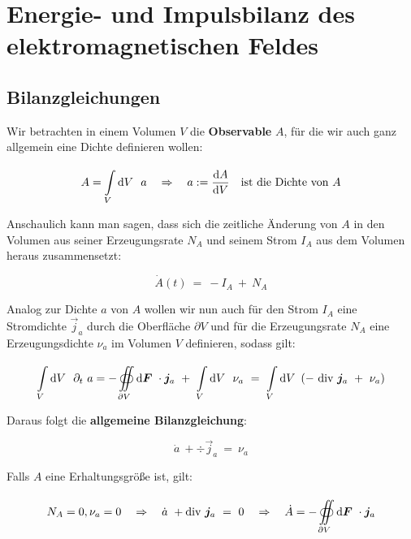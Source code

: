 \chapter[Energie- und Impulsbilanz]{Energie- und Impulsbilanz des elektromagnetischen Feldes}

\section{Bilanzgleichungen}

Wir betrachten in einem Volumen $V$ die \textbf{Observable} $A$, für die wir auch ganz allgemein eine Dichte definieren wollen:

\begin{equation*}
A=\int\limits_{{V}}^{{}}\mathrm{d}{V}\  \ a   \quad \Rightarrow \quad a := \frac{\mathrm{d}{A}}{\mathrm{d}{V}} \quad \text{ist die Dichte von } A
\end{equation*}

Anschaulich kann man sagen, dass sich die zeitliche Änderung von $A$ in den Volumen aus seiner Erzeugungsrate $N_A$ und seinem Strom $I_A$ aus dem Volumen heraus zusammensetzt:

\begin{equation*}
\dot{A}(t) \ = \ - I_A \ + \ N_A
\end{equation*}

Analog zur Dichte $a$ von $A$ wollen wir nun auch für den Strom $I_A$ eine Stromdichte $\vec{j}_a$ durch die Oberfläche $\partial V$ und für die Erzeugungsrate $N_A$ eine Erzeugungsdichte $\nu_a$ im Volumen $V$ definieren, sodass gilt:

\begin{equation*}
\Int{V}{}{V} \ \partial_t \ a = -\Oiint{\partial V}{}{\vec{F}} \cdot\vec{j}_a \ + \ \Int{V}{}{V} \ \nu_a \ = \ \Int{V}{}{V} \left(- \ \div\vec{j}_a \ + \ \nu_a\right)
\end{equation*} 

Daraus folgt die \textbf{allgemeine Bilanzgleichung}:

\begin{equation*}
\dot{a} \ +  \div\vec{j}_a \  =  \ \nu_a
\end{equation*}

\newpage
Falls $A$ eine Erhaltungsgröße ist, gilt:

\begin{equation*}
N_A = 0, \nu_a = 0 \quad \Rightarrow \quad \dot{a}  \ + \text{div } \bm{j}_a \ = \ 0 \quad \Rightarrow \quad \dot{A} = -\oiint\limits_{{\partial V}}^{{}}\mathrm{d}{\bm{F}}\ \cdot\bm{j}_a
\end{equation*}


